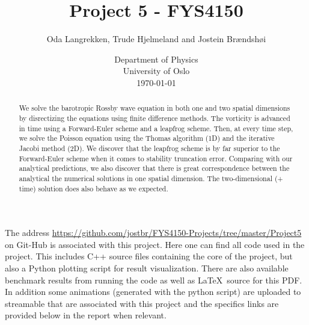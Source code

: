 \documentclass[12pt]{article}
\numberwithin{figure}{section}
\numberwithin{table}{section}
\begin{document}
\begin{titlepage}
\title{Project 5 - FYS4150}
\author{Oda Langrekken, Trude Hjelmeland and Jostein Brændshøi}
\date{
    Department of Physics\\%
    University of Oslo\\[2ex]%
    \today
}
\clearpage
\maketitle
\thispagestyle{empty}

\begin{abstract}
\noindent We solve the barotropic Rossby wave equation in both one and two spatial dimensions by disrectizing the equations using finite difference methods. The vorticity is advanced in time using a Forward-Euler scheme and a leapfrog scheme. Then, at every time step, we solve the Poisson equation using the Thomas algorithm (1D) and the iterative Jacobi method (2D). We discover that the leapfrog scheme is by far superior to the Forward-Euler scheme when it comes to stability truncation error. Comparing with our analytical predictions, we also discover that there is great correspondence between the analytical the numerical solutions in one spatial dimension. The two-dimensional (+ time) solution does also behave as we expected.\\
\end{abstract}
\vspace{2.00cm}


\noindent The address \url{https://github.com/jostbr/FYS4150-Projects/tree/master/Project5} on Git-Hub is associated with this project. Here one can find all code used in the project. This includes C++ source files containing the core of the project, but also a Python plotting script for result visualization. There are also available benchmark results from running the code as well as \LaTeX \ source for this PDF. In addition some animations (generated with the python script) are uploaded to streamable that are associated with this project and the specifics links are provided below in the report when relevant.

\end{titlepage}
\pagebreak

\tableofcontents
\pagebreak


\end{document}
